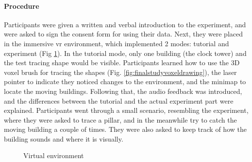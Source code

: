 \paragraph{Procedure}
Participants were given a written and verbal introduction to the experiment,
and were asked to sign the consent form for using their data.
Next, they were placed in the immersive \gls{vr} environment, which implemented 2 modes: tutorial and experiment (Fig \ref{fig:finalstudy_immersive_vr_environment}). In the tutorial mode, only one building (the clock tower) and the test tracing shape would be visible.
Participants learned how to use the 3D voxel brush for tracing the shapes (Fig. \ref{fig:finalstudyvoxeldrawing}), the laser pointer to indicate they noticed changes to the environment, and the minimap to locate the moving buildings. Following that, the audio feedback was introduced, and the differences between the tutorial and the actual experiment part were explained. Participants went through a small scenario, resembling the experiment, where they were asked to trace a pillar, and in the meanwhile try to catch the moving building a couple of times. They were also asked to keep track of how the building sounds and where it is visually.

\begin{figure}
	\centering
	
	\par
	\par
	
	\caption{Virtual environment}
	\label{fig:finalstudy_immersive_vr_environment}
\end{figure}

